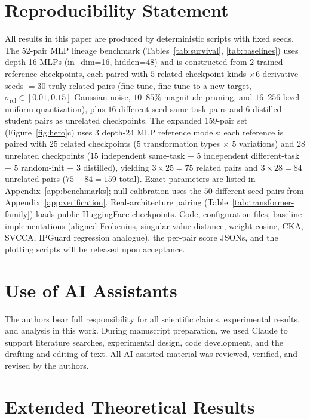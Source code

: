 \section{Reproducibility Statement}\label{app:reproducibility}

All results in this paper are produced by deterministic scripts with fixed seeds. The 52-pair MLP lineage benchmark (Tables~\ref{tab:survival}, \ref{tab:baselines}) uses depth-16 MLPs (in\_dim=16, hidden=48) and is constructed from $2$ trained reference checkpoints, each paired with $5$ related-checkpoint kinds $\times 6$ derivative seeds $=30$ truly-related pairs (fine-tune, fine-tune to a new target, $\sigma_{\text{rel}} \in [0.01,0.15]$ Gaussian noise, $10$--$85\%$ magnitude pruning, and $16$--$256$-level uniform quantization), plus $16$ different-seed same-task pairs and $6$ distilled-student pairs as unrelated checkpoints. The expanded 159-pair set (Figure~\ref{fig:hero}c) uses $3$ depth-24 MLP reference models: each reference is paired with $25$ related checkpoints ($5$ transformation types $\times$ $5$ variations) and $28$ unrelated checkpoints ($15$ independent same-task $+$ $5$ independent different-task $+$ $5$ random-init $+$ $3$ distilled), yielding $3 \times 25 = 75$ related pairs and $3 \times 28 = 84$ unrelated pairs ($75 + 84 = 159$ total). Exact parameters are listed in Appendix~\ref{app:benchmarks}; null calibration uses the $50$ different-seed pairs from Appendix~\ref{app:verification}. Real-architecture pairing (Table~\ref{tab:transformer-family}) loads public HuggingFace checkpoints. Code, configuration files, baseline implementations (aligned Frobenius, singular-value distance, weight cosine, CKA, SVCCA, IPGuard regression analogue), the per-pair score JSONs, and the plotting scripts will be released upon acceptance.

\section{Use of AI Assistants}\label{app:ai-assistants}

The authors bear full responsibility for all scientific claims, experimental results, and analysis in this work. During manuscript preparation, we used Claude to support literature searches, experimental design, code development, and the drafting and editing of text. All AI-assisted material was reviewed, verified, and revised by the authors.

\section{Extended Theoretical Results}\label{app:proofs}

